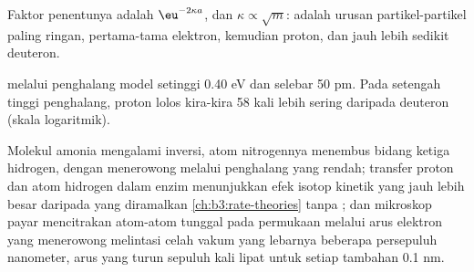 Faktor penentunya adalah $\eu^{-2\kappa a}$, dan $\kappa \propto \sqrt m$:
 adalah urusan partikel-partikel paling ringan, pertama-tama
elektron, kemudian proton, dan jauh lebih sedikit deuteron.

\begin{omfigure}

{\small {} melalui penghalang model setinggi 0.40 eV dan
selebar 50 pm. Pada setengah tinggi penghalang, proton lolos kira-kira 58
kali lebih sering daripada deuteron (skala logaritmik).}
\end{omfigure}

\begin{remark}\label{rem:b3:quantum-model-systems:where}
Molekul amonia mengalami inversi, atom nitrogennya menembus bidang ketiga
hidrogen, dengan menerowong melalui penghalang yang rendah; transfer proton dan atom hidrogen dalam enzim menunjukkan efek
isotop kinetik yang jauh lebih besar daripada yang diramalkan
\cref{ch:b3:rate-theories} tanpa ; dan mikroskop 
payar mencitrakan atom-atom tunggal pada permukaan melalui arus elektron yang
menerowong melintasi celah vakum yang lebarnya beberapa persepuluh nanometer,
arus yang turun sepuluh kali lipat untuk setiap tambahan 0.1 nm.
\end{remark}

